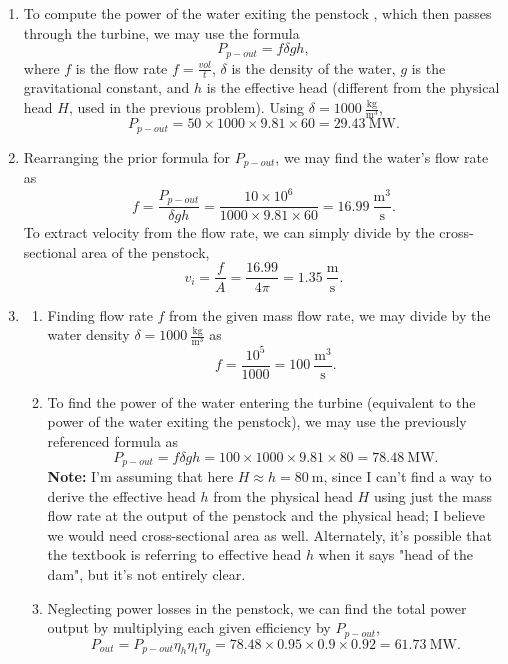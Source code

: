 \documentclass{article}
\begin{document}
\begin{enumerate}[label=\thesubsection]
		Then, 
		\[
			PE_{r} = 10^{13} \times 9.81 \times 100 = 9.81 \times 10^6 \ \mathrm{GJ}.
		\]
		\setcounter{subsection}{17}
		\item To compute the power of the water exiting the penstock , which then passes through the turbine, we may use the formula 
		\[
			P_{p-out} = f\delta gh, 
		\]
		where \(f\) is the flow rate \(f = \frac{vol}{t}\), \(\delta\) is the density of the water, \(g\) is the gravitational constant, and \(h\) is the effective head (different from the physical head \(H\), used in the previous problem). Using \(\delta = 1000 \ \mathrm{\frac{kg}{m^3}}\), 
		\[
			P_{p-out} = 50 \times 1000 \times 9.81 \times 60 = 29.43 \ \mathrm{MW}.
		\]
		\setcounter{subsection}{18}
	\item Rearranging the prior formula for \(P_{p-out}\), we may find the water's flow rate as 
		\[
			f = \frac{P_{p-out}}{\delta gh} = \frac{10\times 10^6}{1000 \times 9.81 \times 60} = 16.99 \ \mathrm{\frac{m^3}{s}}.
		\]
		To extract velocity from the flow rate, we can simply divide by the cross-sectional area of the penstock,
		\[
			v_i = \frac{f}{A} = \frac{16.99}{4\pi} = 1.35 \ \mathrm{\frac{m}{s}}.
		\]
		\setcounter{subsection}{19}
	\item
		\begin{enumerate}[label=\alph*)]
			\item Finding flow rate \(f\) from the given mass flow rate, we may divide by the water density \(\delta = 1000 \ \mathrm{\frac{kg}{m^3}}\) as
				\[
					f = \frac{10^5}{1000} = 100 \ \mathrm{\frac{m^3}{s}}.
				\]
			\item To find the power of the water entering the turbine (equivalent to the power of the water exiting the penstock), we may use the previously referenced formula as
				\[
					P_{p-out} = f\delta gh = 100 \times 1000 \times 9.81 \times 80 = 78.48 \ \mathrm{MW}.
				\]
				\textbf{Note:} I'm assuming that here \(H \approx h = 80 \ \mathrm{m}\), since I can't find a way to derive the effective head \(h\) from the physical head \(H\) using just the mass flow rate at the output of the penstock and the physical head; I believe we would need cross-sectional area as well. Alternately, it's possible that the textbook is referring to effective head \(h\) when it says "head of the dam", but it's not entirely clear.
			\item Neglecting power losses in the penstock, we can find the total power output by multiplying each given efficiency by \(P_{p-out}\),
				\[
					P_{out} = P_{p-out}\eta_{h}\eta_{t}\eta_{g} = 78.48 \times 0.95 \times 0.9 \times 0.92 = 61.73 \ \mathrm{MW}.
\]
\end{enumerate}
\end{enumerate}
\end{document}
